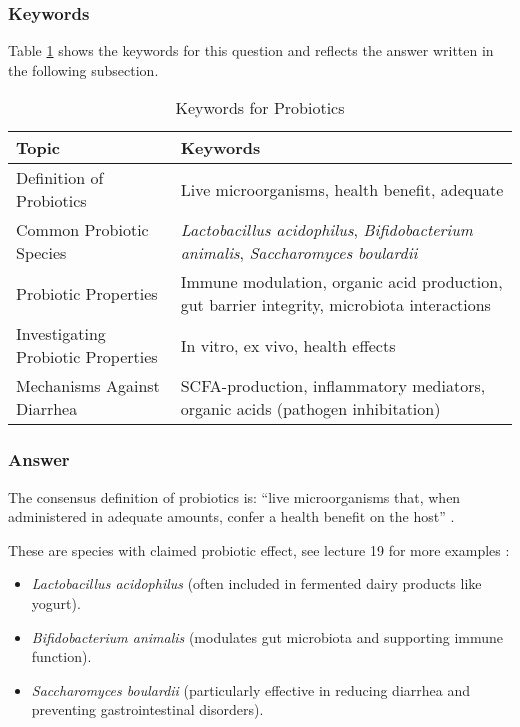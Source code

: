 \subsubsection*{Keywords}
Table \ref{tab:KW-Probiotics} shows the keywords for this question and reflects the answer written in the following subsection.
\begin{table}[h]
    \centering
    \caption{Keywords for Probiotics} 
    \label{tab:KW-Probiotics}
    \begin{tabularx}{\textwidth}{l|X}
        \textbf{Topic} & \textbf{Keywords} \\
        \hline
        Definition of Probiotics & Live microorganisms, health benefit, adequate \\

        Common Probiotic Species & \textit{Lactobacillus acidophilus}, \textit{Bifidobacterium animalis}, \textit{Saccharomyces boulardii} \\

        Probiotic Properties & Immune modulation, organic acid production, gut barrier integrity, microbiota interactions \\

        Investigating Probiotic Properties & In vitro, ex vivo, health effects \\

        Mechanisms Against Diarrhea & SCFA-production, inflammatory mediators, organic acids (pathogen inhibitation) \\
    \end{tabularx}
\end{table}

\subsubsection*{Answer}
The consensus definition of probiotics is: “live microorganisms that, when administered in adequate amounts, confer a health benefit on the host” \cite*{L10-Pro_Pre}.

These are species with claimed probiotic effect, see lecture 19 for more examples \cite*{LS19}:
\begin{itemize}
    \item \textit{Lactobacillus acidophilus} (often included in fermented dairy products like yogurt).
    \item \textit{Bifidobacterium animalis} (modulates gut microbiota and supporting immune function).
    \item \textit{Saccharomyces boulardii} (particularly effective in reducing diarrhea and preventing gastrointestinal disorders).
\end{itemize}

